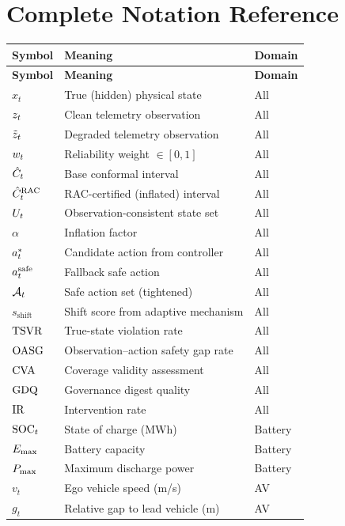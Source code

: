 \section{Complete Notation Reference}\label{app:notation}

\begin{longtable}{lll}
\toprule
\textbf{Symbol} & \textbf{Meaning} & \textbf{Domain} \\
\midrule
\endfirsthead
\toprule
\textbf{Symbol} & \textbf{Meaning} & \textbf{Domain} \\
\midrule
\endhead
$x_t$          & True (hidden) physical state    & All \\
$z_t$          & Clean telemetry observation      & All \\
$\tilde{z}_t$         & Degraded telemetry observation   & All \\
$w_t$          & Reliability weight $\in [0,1]$   & All \\
$\hat{C}_t$        & Base conformal interval          & All \\
$\hat{C}_t^{\mathrm{RAC}}$        & RAC-certified (inflated) interval & All \\
$U_t$          & Observation-consistent state set  & All \\
$\alpha$       & Inflation factor                 & All \\
$a_t^{*}$       & Candidate action from controller & All \\
$a_t^{\mathrm{safe}}$       & Fallback safe action             & All \\
$\mathcal{A}_t$        & Safe action set (tightened)      & All \\
$s_{\mathrm{shift}}$ & Shift score from adaptive mechanism & All \\
$\mathrm{TSVR}$        & True-state violation rate        & All \\
$\mathrm{OASG}$        & Observation--action safety gap rate & All \\
$\mathrm{CVA}$         & Coverage validity assessment     & All \\
$\mathrm{GDQ}$         & Governance digest quality        & All \\
$\mathrm{IR}$          & Intervention rate                & All \\
$\mathrm{SOC}_t$       & State of charge (MWh)            & Battery \\
$E_{\max}$        & Battery capacity                 & Battery \\
$P_{\max}$        & Maximum discharge power          & Battery \\
$v_t$          & Ego vehicle speed (m/s)          & AV \\
$g_t$          & Relative gap to lead vehicle (m) & AV \\
\bottomrule
\end{longtable}

